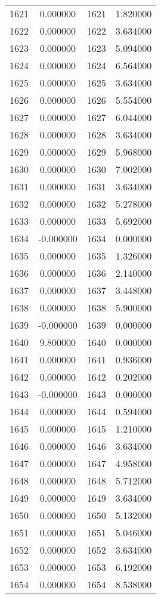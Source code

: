 \documentclass[12pt]{article}
\begin{document}
\begin{longtable}{@{}cccc@{}}
1621 & 0.000000 & 1621 & 1.820000 \\
1622 & 0.000000 & 1622 & 3.634000 \\
1623 & 0.000000 & 1623 & 5.094000 \\
1624 & 0.000000 & 1624 & 6.564000 \\
1625 & 0.000000 & 1625 & 3.634000 \\
1626 & 0.000000 & 1626 & 5.554000 \\
1627 & 0.000000 & 1627 & 6.044000 \\
1628 & 0.000000 & 1628 & 3.634000 \\
1629 & 0.000000 & 1629 & 5.968000 \\
1630 & 0.000000 & 1630 & 7.002000 \\
1631 & 0.000000 & 1631 & 3.634000 \\
1632 & 0.000000 & 1632 & 5.278000 \\
1633 & 0.000000 & 1633 & 5.692000 \\
1634 & -0.000000 & 1634 & 0.000000 \\
1635 & 0.000000 & 1635 & 1.326000 \\
1636 & 0.000000 & 1636 & 2.140000 \\
1637 & 0.000000 & 1637 & 3.448000 \\
1638 & 0.000000 & 1638 & 5.900000 \\
1639 & -0.000000 & 1639 & 0.000000 \\
1640 & 9.800000 & 1640 & 0.000000 \\
1641 & 0.000000 & 1641 & 0.936000 \\
1642 & 0.000000 & 1642 & 0.202000 \\
1643 & -0.000000 & 1643 & 0.000000 \\
1644 & 0.000000 & 1644 & 0.594000 \\
1645 & 0.000000 & 1645 & 1.210000 \\
1646 & 0.000000 & 1646 & 3.634000 \\
1647 & 0.000000 & 1647 & 4.958000 \\
1648 & 0.000000 & 1648 & 5.712000 \\
1649 & 0.000000 & 1649 & 3.634000 \\
1650 & 0.000000 & 1650 & 5.132000 \\
1651 & 0.000000 & 1651 & 5.046000 \\
1652 & 0.000000 & 1652 & 3.634000 \\
1653 & 0.000000 & 1653 & 6.192000 \\
1654 & 0.000000 & 1654 & 8.538000 \\

\end{longtable}
\end{document}
